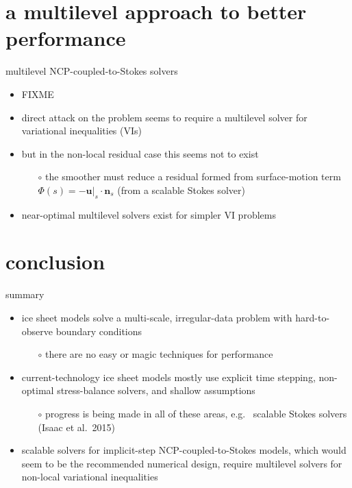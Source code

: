 \documentclass[svgnames,
               hyperref={colorlinks,citecolor=DeepPink4,linkcolor=FireBrick,urlcolor=Maroon},
               usepdftitle=false]  %
               {beamer}
\newcommand{\bn}{\mathbf{n}}
\newcommand{\bu}{\mathbf{u}}
\begin{document}
\section{a multilevel approach to better performance}



\begin{frame}{multilevel NCP-coupled-to-Stokes solvers}

\begin{itemize}
\item FIXME
\item direct attack on the problem seems to require a \alert{multilevel} solver for \alert{variational inequalities} (VIs)
\item but in the non-local residual case this seems not to exist
    \begin{itemize}
    \item[$\circ$] the \alert{smoother} must reduce a residual formed from surface-motion term $\Phi(s) = - \bu|_s\cdot \bn_s$ (from a scalable Stokes solver)
    \end{itemize}
\item near-optimal multilevel solvers exist for simpler VI problems
\end{itemize}
\end{frame}


\section{conclusion}

\begin{frame}{\alert{summary}}

\begin{itemize}
\item ice sheet models solve a multi-scale, irregular-data problem with hard-to-observe boundary conditions
   \begin{itemize}
   \item[$\circ$] there are \alert{no easy or magic techniques} for performance
   \end{itemize}
\item<2-> current-technology ice sheet models mostly use \alert{explicit} time stepping, \alert{non-optimal} stress-balance solvers, and \alert{shallow} assumptions
   \begin{itemize}
   \item[$\circ$] progress is being made in all of these areas, e.g.~ scalable Stokes solvers (Isaac et al.~2015)
   \end{itemize}
\item<3> scalable solvers for implicit-step NCP-coupled-to-Stokes models, which would seem to be the recommended numerical design, require \alert{multilevel solvers for non-local variational inequalities}
\end{itemize}
\end{frame}
\end{document}
